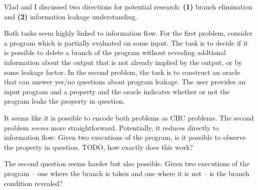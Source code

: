 \documentclass{article}
\begin{document}
Vlad and I discussed two directions for potential research:
\textbf{(1)} branch elimination and \textbf{(2)} information leakage
understanding.

Both tasks seem highly linked to information flow.
%
For the first problem, consider a program which is partially evaluated
on some input. The task is to decide if it is possible to
delete a branch of the program without revealing addtional information
about the output that is not already implied by the output, or by some
leakage factor.
%
In the second problem, the task is to construct an oracle that can
answer yes/no questions about program leakage. The user provides an
input program and a property and the oracle indicates whether or not
the program leaks the property in question.

It seems like it is possible to encode both problems as CHC problems.
The second problem \emph{seems} more straightforward.
%
Potentially, it reduces directly to information flow: Given two
executions of the program, is it possible to observe the property in
question. TODO, how exactly does this work?

The second question seems harder but also possible. Given two
executions of the program -- one where the branch is taken and one
where it is not -- is the branch condition revealed?
\end{document}
